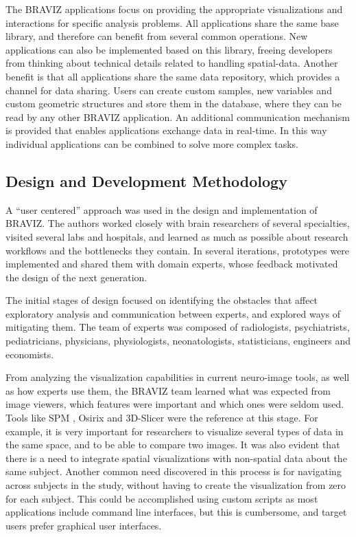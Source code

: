 \documentclass[utf8,paper]{frontiersSCNS} %
\begin{document}
The BRAVIZ applications focus on providing the appropriate visualizations and interactions for specific analysis problems. All applications share the same base library, and therefore can benefit from several common operations. New applications can also be implemented based on this library, freeing developers from thinking about technical details related to handling spatial-data. Another benefit is that all applications share the same data repository, which provides a channel for data sharing. Users can create custom samples, new variables and custom geometric structures and store them in the database, where they can be read by any other BRAVIZ application. An additional communication mechanism is provided that enables applications exchange data in real-time. In this way individual applications can be combined to solve more complex tasks.


\subsection{Design and Development Methodology}

A ``user centered'' approach\citep{fernandez_user-centered_2013,wassink_applying_2009} was used in the design and implementation of BRAVIZ. The authors worked closely with brain researchers of several specialties, visited several labs and hospitals, and learned as much as possible about research workflows and the bottlenecks they contain. In several iterations, prototypes were implemented and shared them with domain experts, whose feedback motivated the design of the next generation. 

The initial stages of design focused on identifying the obstacles that affect exploratory analysis and communication between experts, and explored ways of mitigating them. The team of experts was composed of radiologists, psychiatrists, pediatricians, physicians, physiologists, neonatologists,  statisticians, engineers and economists. 

From analyzing the visualization capabilities in current neuro-image tools, as well as how experts use them, the BRAVIZ team learned what was expected from image viewers, which features were important and which ones were seldom used. Tools like SPM \citep{friston_statistical_2007}, Osirix \citep{rosset_osirix:_2004} and 3D-Slicer \citep{fedorov_3d_2012} were the reference at this stage. For example, it is very important for researchers to visualize several types of data in the same space, and to be able to compare two images. It was also evident that there is a need to integrate spatial visualizations with non-spatial data about the same subject. Another common need discovered in this process is for navigating across subjects in the study, without having to create the visualization from zero for each subject. This could be accomplished using custom scripts as most applications include command line interfaces, but this is cumbersome, and target users prefer graphical user interfaces.
\end{document}
